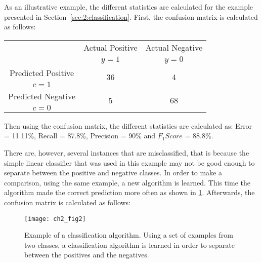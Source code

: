  \newpage
  As an illustrative example, the different statistics are calculated for the example presented 
  in Section~\ref{sec:2:classification}. First, the confusion matrix is calculated as 
  follows:
  \begin{center}
    \footnotesize
  \begin{tabular}{c|c|c}
    \multicolumn{1}{c|}{}  & Actual Positive& Actual Negative \\
    \multicolumn{1}{c|}{} & $y=1$& $y=0$ \\
    \hline
    Predicted Positive    & \multirow{ 2}{*}{36} & \multirow{ 
    2}{*}{4} \\
    $c=1$ & &\\
    \hline
    Predicted Negative    & \multirow{ 2}{*}{5} & \multirow{ 
    2}{*}{68} \\
    $c=0$ & &\\
  \end{tabular}
  \end{center}
  Then using the confusion matrix, the different statistics are calculated as: Error = 
11.11\%, Recall = 87.8\%, Precision = 90\% and $F_1Score$ = 88.8\%.
	
There are, however, several instances that are misclassified, that is because the simple linear 
classifier that was used in this example may not be good enough to separate between the positive 
and negative classes. In order to make a comparison, using the same example, a new 
algorithm is learned. This time the algorithm made the correct prediction more often as shown in 
\figurename{ \ref{fig:2:3}}. Afterwards, the confusion matrix is calculated as follows:

\begin{figure}[t!]
  \centering
  \texttt{[image: ch2\_fig2]}
  \caption{Example of a classification algorithm. Using a set of examples from two classes, a 
  classification algorithm is learned in order to separate between the positives and the negatives. 
}
  \label{fig:2:3}
\end{figure}

